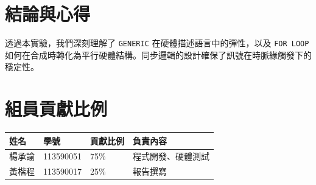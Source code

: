\documentclass[12pt, a4paper]{article}
\begin{document}
\section{結論與心得}
透過本實驗，我們深刻理解了 \texttt{GENERIC} 在硬體描述語言中的彈性，以及 \texttt{FOR LOOP} 如何在合成時轉化為平行硬體結構。同步邏輯的設計確保了訊號在時脈緣觸發下的穩定性。

\section{組員貢獻比例}
\begin{table}[H]
\centering
\begin{tabular}{@{}llll@{}}
\toprule
姓名 & 學號 & 貢獻比例 & 負責內容 \\
\midrule
楊承諭 & 113590051 & 75\% & 程式開發、硬體測試 \\
黃楷程 & 113590017 & 25\% & 報告撰寫 \\
\bottomrule
\end{tabular}
\end{table}
\end{document}
